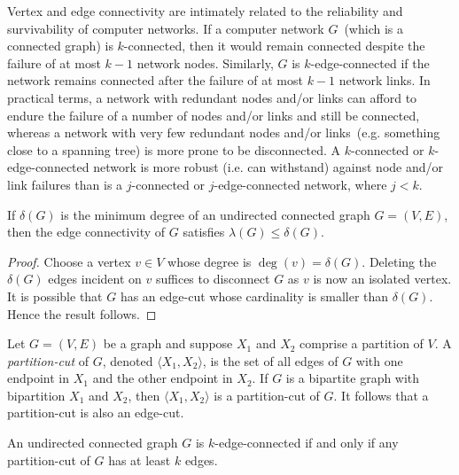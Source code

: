 Vertex and edge connectivity are intimately related to the reliability
and survivability of computer networks. If a computer network
$G$~(which is a connected graph) is $k$-connected, then it would
remain connected despite the failure of at most $k - 1$ network
nodes. Similarly, $G$ is $k$-edge-connected if the network remains
connected after the failure of at most $k - 1$ network links. In
practical terms, a network with redundant nodes and/or links can
afford to endure the failure of a number of nodes and/or links and
still be connected, whereas a network with very few redundant nodes
and/or links~(e.g. something close to a spanning tree) is more prone
to be disconnected. A $k$-connected or $k$-edge-connected network is
more robust (i.e. can withstand) against node and/or link failures
than is a $j$-connected or $j$-edge-connected network, where $j < k$.

\begin{proposition}
\label{prop:distance_connectivity:edge_degree_inequality}
If $\delta(G)$ is the minimum degree of an undirected connected graph
$G = (V,E)$, then the edge connectivity of $G$ satisfies
$\lambda(G) \leq \delta(G)$.
\end{proposition}

\begin{proof}
Choose a vertex $v \in V$ whose degree is
$\deg(v) = \delta(G)$. Deleting the $\delta(G)$ edges incident on $v$
suffices to disconnect $G$ as $v$ is now an isolated vertex. It is
possible that $G$ has an edge-cut whose cardinality is smaller than
$\delta(G)$. Hence the result follows.
\end{proof}

Let $G = (V,E)$ be a graph and suppose $X_1$ and $X_2$ comprise a
partition of $V$. A \emph{partition-cut} of $G$, denoted
$\langle X_1, X_2 \rangle$, is the set of all edges of $G$ with one
endpoint in $X_1$ and the other endpoint in $X_2$. If $G$ is a
bipartite graph with bipartition $X_1$ and $X_2$, then
$\langle X_1, X_2 \rangle$ is a partition-cut of $G$. It follows that
a partition-cut is also an edge-cut.

\begin{proposition}
An undirected connected graph $G$ is $k$-edge-connected if and only if
any partition-cut of $G$ has at least $k$ edges.
\end{proposition}

